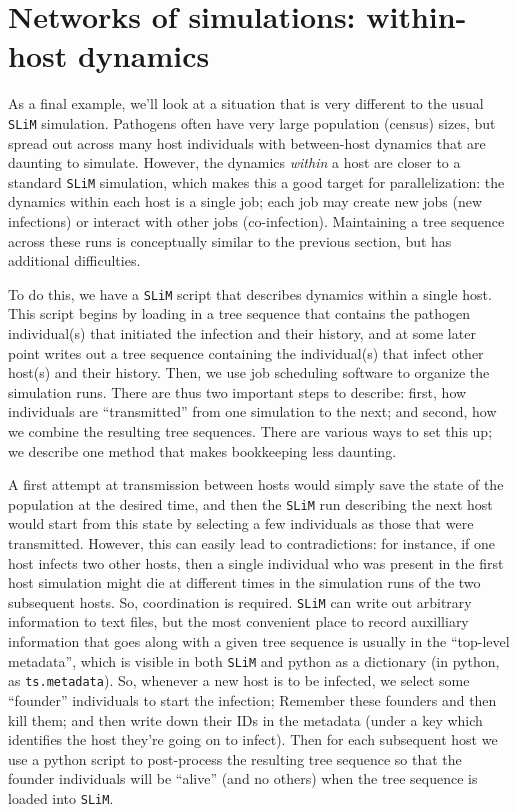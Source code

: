 \documentclass[12pt]{article}
\newcommand{\slim}[0]{\texttt{SLiM}\xspace}
\begin{document}
\section*{Networks of simulations: within-host dynamics}

As a final example, we'll look at a situation that is very different to the usual \slim simulation.
Pathogens often have very large population (census) sizes,
but spread out across many host individuals with between-host dynamics
that are daunting to simulate.
However, the dynamics \emph{within} a host are closer to a standard \slim simulation,
which makes this a good target for parallelization:
the dynamics within each host is a single job;
each job may create new jobs (new infections)
or interact with other jobs (co-infection).
Maintaining a tree sequence across these runs is conceptually similar
to the previous section, but has additional difficulties.

To do this, we have a \slim script that describes dynamics within a single host.
This script begins by loading in a tree sequence
that contains the pathogen individual(s) that initiated the infection and their history,
and at some later point writes out a tree sequence containing the individual(s) that infect other host(s)
and their history.
Then, we use job scheduling software to organize the simulation runs.
There are thus two important steps to describe:
first, how individuals are ``transmitted'' from one simulation to the next;
and second, how we combine the resulting tree sequences.
There are various ways to set this up; we describe one method that makes bookkeeping
less daunting.

A first attempt at transmission between hosts would simply save the state of the population
at the desired time, and then the \slim run describing the next host
would start from this state by selecting a few individuals as those that were transmitted.
However, this can easily lead to contradictions: for instance,
if one host infects two other hosts,
then a single individual who was present in the first host simulation
might die at different times in the simulation runs of the two subsequent hosts.
So, coordination is required.
\slim can write out arbitrary information to text files,
but the most convenient place to record auxilliary information that goes along with a given tree sequence
is usually in the ``top-level metadata'',
which is visible in both \slim and python as a dictionary
(in python, as \verb|ts.metadata|).
So, whenever a new host is to be infected,
we select some ``founder'' individuals to start the infection;
Remember these founders and then kill them;
and then write down their IDs in the metadata
(under a key which identifies the host they're going on to infect).
Then for each subsequent host
we use a python script to post-process the resulting tree sequence
so that the founder individuals will be ``alive'' (and no others)
when the tree sequence is loaded into \slim.
\end{document}
